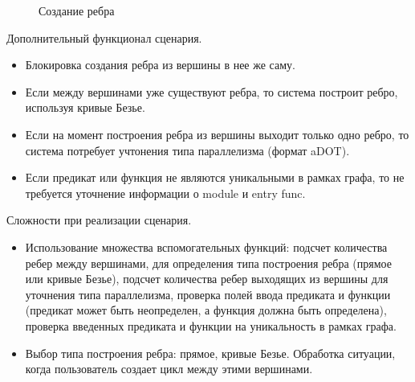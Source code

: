 \begin{figure}[ht!]
\caption{Создание ребра}
\label{fig:edge_create}
\end{figure}

Дополнительный функционал сценария.
\begin{itemize}
	\item Блокировка создания ребра из вершины в нее же саму.
	\item Если между вершинами уже существуют ребра, то система построит ребро, используя кривые Безье.
	\item Если на момент построения ребра из вершины выходит только одно ребро, то система потребует учтонения типа параллелизма (формат aDOT).
	\item Если предикат или функция не являются уникальными в рамках графа, то не требуется уточнение информации о module и entry func.
\end{itemize}

Сложности при реализации сценария.
\begin{itemize}
	\item Использование множества вспомогательных функций: подсчет количества ребер между вершинами, для определения типа построения ребра (прямое или кривые Безье), подсчет количества ребер выходящих из вершины для уточнения типа параллелизма, проверка полей ввода предиката и функции (предикат может быть неопределен, а функция должна быть определена), проверка введенных предиката и функции на уникальность в рамках графа.
	\item Выбор типа построения ребра: прямое, кривые Безье. Обработка ситуации, когда пользователь создает цикл между этими вершинами.
\end{itemize}

